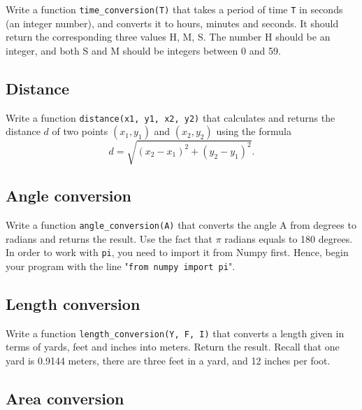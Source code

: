 Write a function {\tt time\_conversion(T)} that takes 
a period of time {\tt T} in seconds (an integer number), and converts it to 
hours, minutes and seconds. It should return the corresponding 
three values H, M, S. The number H should be an integer, and both S 
and M should be integers between 0 and 59.


\subsection{Distance}

Write a function {\tt distance(x1, y1, x2, y2)} that calculates and 
returns the distance $d$ of two points $(x_1, y_1)$ and $(x_2, y_2)$
using the formula 
$$
d = \sqrt{(x_2 - x_1)^2 + (y_2 - y_1)^2}.
$$ 


\subsection{Angle conversion}

Write a function {\tt angle\_conversion(A)} that converts the angle A
from degrees to radians and returns the result. Use the fact that $\pi$
radians equals to 180 degrees. In order to work with {\tt pi}, you need to 
import it from Numpy first. Hence, begin your program with the line 
"{\tt from numpy import pi}".


\subsection{Length conversion}

Write a function {\tt length\_conversion(Y, F, I)} that converts a length given
in terms of yards, feet and inches into meters. Return the result. Recall 
that one yard is 0.9144 meters, there are three feet in a yard, and 
12 inches per foot.


\subsection{Area conversion}

